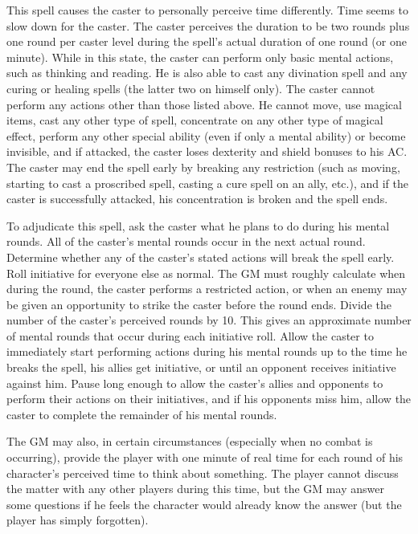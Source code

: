 \begin{multicols}{2}
This spell causes the caster to personally perceive time differently.  Time seems to slow down for the caster.  The caster perceives the duration to be two rounds plus one round per caster level during the spell's actual duration of one round (or one minute).  While in this state, the caster can perform only basic mental actions, such as thinking and reading.  He is also able to cast any divination spell and any curing or healing spells (the latter two on himself only).  The caster cannot perform any actions other than those listed above.  He cannot move, use magical items, cast any other type of spell, concentrate on any other type of magical effect, perform any other special ability (even if only a mental ability) or become invisible, and if attacked, the caster loses dexterity and shield bonuses to his AC.  The caster may end the spell early by breaking any restriction (such as moving, starting to cast a proscribed spell, casting a cure spell on an ally, etc.), and if the caster is successfully attacked, his concentration is broken and the spell ends.

To adjudicate this spell, ask the caster what he plans to do during his mental rounds.  All of the caster's mental rounds occur in the next actual round.  Determine whether any of the caster's stated actions will break the spell early.  Roll initiative for everyone else as normal.  The GM must roughly calculate when during the round, the caster performs a restricted action, or when an enemy may be given an opportunity to strike the caster before the round ends.  Divide the number of the caster's perceived rounds by 10.  This gives an approximate number of mental rounds that occur during each initiative roll.  Allow the caster to immediately start performing actions during his mental rounds up to the time he breaks the spell, his allies get initiative, or until an opponent receives initiative against him.  Pause long enough to allow the caster's allies and opponents to perform their actions on their initiatives, and if his opponents miss him, allow the caster to complete the remainder of his mental rounds.

The GM may also, in certain circumstances (especially when no combat is occurring), provide the player with one minute of real time for each round of his character's perceived time to think about something.  The player cannot discuss the matter with any other players during this time, but the GM may answer some questions if he feels the character would already know the answer (but the player has simply forgotten).


\end{multicols}
